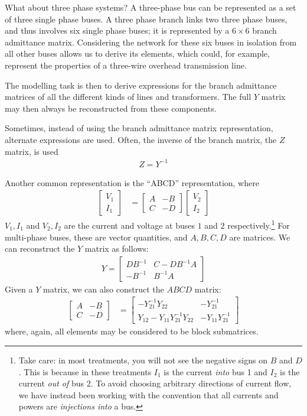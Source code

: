 \documentclass[10pt]{article}
\begin{document}
What about three phase systems? A three-phase bus can be represented as a set of three single phase buses. A three phase branch links two three phase buses, and thus involves six single phase buses; it is represented by a $6 \times 6$ branch admittance matrix. Considering the network for these six buses in isolation from all other buses allows us to derive its elements, which could, for example, represent the properties of a three-wire overhead transmission line.

The modelling task is then to derive expressions for the branch admittance matrices of all the different kinds of lines and transformers. The full $Y$ matrix may then always be reconstructed from these components. 

Sometimes, instead of using the branch admittance matrix representation, alternate expressions are used. Often, the inverse of the branch matrix, the $Z$ matrix, is used
\begin{align}
	Z = Y^{-1}
\end{align}

Another common representation is the ``ABCD'' representation, where
\begin{align}
	\begin{bmatrix}
		V_1 \\ I_1
	\end{bmatrix} &= \begin{bmatrix}
		A & -B \\ C & -D
	\end{bmatrix}\begin{bmatrix}
		V_2 \\ I_2
	\end{bmatrix}
\end{align}
$V_1, I_1$ and $V_2, I_2$ are the current and voltage at buses $1$ and $2$ respectively.\footnote{Take care: in most treatments, you will not see the negative signs on $B$ and $D$. This is because in these treatments $I_1$ is the current \emph{into} bus 1 and $I_2$ is the current \emph{out of} bus 2. To avoid choosing arbitrary directions of current flow, we have instead been working with the convention that all currents and powers are \emph{injections into} a bus.} For multi-phase buses, these are vector quantities, and $A, B, C, D$ are matrices. We can reconstruct the $Y$ matrix as follows:
\begin{align}
	Y = \begin{bmatrix}
		DB^{-1} & C - DB^{-1}A \\
		-B^{-1} & B^{-1}A
	\end{bmatrix}
\end{align}
Given a $Y$ matrix, we can also construct the $ABCD$ matrix:
\begin{align}
	\begin{bmatrix} A & -B \\ C & -D \end{bmatrix} &=
	\begin{bmatrix}
		-Y_{21}^{-1}Y_{22} & -Y_{21}^{-1} \\
		Y_{12} - Y_{11}Y_{21}^{-1}Y_{22} & -Y_{11}Y_{21}^{-1}
	\end{bmatrix}
\end{align}
where, again, all elements may be considered to be block submatrices.
\end{document}
